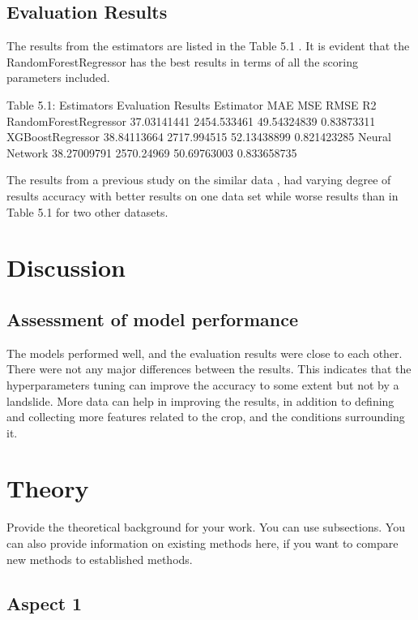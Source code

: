 \documentclass[sigconf, nonacm, natbib, screen, balance=False]{acmart}
\begin{document}
\subsection{Evaluation Results}\label{sec:aspect1}

The results from the estimators are listed in the Table 5.1
. It is evident that the RandomForestRegressor has the best results in terms of all the scoring parameters included.

Table 5.1: Estimators Evaluation Results
Estimator	MAE	MSE	RMSE	R2
RandomForestRegressor	37.03141441	2454.533461	49.54324839	0.83873311
XGBoostRegressor	38.84113664	2717.994515	52.13438899	0.821423285
Neural Network	38.27009791	2570.24969	50.69763003	0.833658735

The results from a previous study on the similar data \cite{lied}, had varying degree of results accuracy with better results on one data set while worse results than in Table 5.1 for two other datasets.


\section{Discussion}\label{sec:aspect1}

\subsection{Assessment of model performance}\label{sec:aspect1}

The models performed well, and the evaluation results were close to each other. There were not any major differences between the results. This indicates that the hyperparameters tuning can improve the accuracy to some extent but not by a landslide. More data can help in improving the results, in addition to defining and collecting more features related to the crop, and the conditions surrounding it.

\section{Theory}\label{sec:theory}
Provide the theoretical background for your work. You can use
subsections. You can also provide information on existing
methods here, if you want to compare new methods to established methods.


\subsection{Aspect 1}\label{sec:aspect1}
\end{document}
